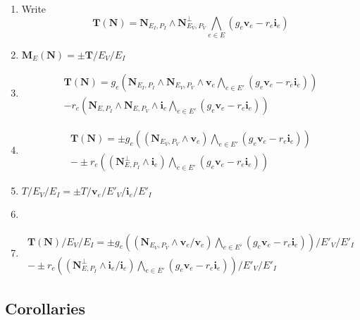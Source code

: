 \documentclass[12pt]{article}
\theoremstyle{definition}
\newcommand{\ext}[1]{\ensuremath{\mathbf{#1}}}
\begin{document}
\begin{enumerate}
\item Write 
\[
\ext{T}(\ext{N})=\ext{N}_{E_I,P_I}
                 \wedge
		 \ext{N}^{\perp}_{E_V,P_V}
		 \bigwedge_{e\in E}(g_e\ext{v}_e-r_e\ext{i}_e)
\]
\item $\ext{M}_E(\ext{N}) = \pm \ext{T}/E_V/E_I$
\item 
\begin{multline}
\ext{T}(\ext{N})=g_e
                 \left(
                    \ext{N}_{E_I,P_I}
                    \wedge
                    \ext{N}_{E_V,P_V}
		    \wedge \ext{v}_e                  
		    \bigwedge_{e\in E'}(g_e\ext{v}_e-r_e\ext{i}_e)
                 \right)  \\
		 - r_e
		 \left(
                    \ext{N}_{E,P_I}
                    \wedge
		    \ext{N}_{E,P_V}
                    \wedge \ext{i}_e
		    \bigwedge_{e\in E'}(g_e\ext{v}_e-r_e\ext{i}_e)
		 \right)
\end{multline}
\item
\begin{multline}
\ext{T}(\ext{N})=\pm g_e
                 \left(
                    (\ext{N}_{E_V,P_V}
                       \wedge \ext{v}_e)
                    \bigwedge_{e\in E'}(g_e\ext{v}_e-r_e\ext{i}_e)
                 \right) \\
		 - \pm r_e
		 \left(
                    (\ext{N}^{\perp}_{E,P_I}
                     \wedge \ext{i}_e)
		    \bigwedge_{e\in E'}(g_e\ext{v}_e-r_e\ext{i}_e)
		 \right)
\end{multline}
\item
$T/E_V/E_I=\pm T/\ext{v}_e/E'_V/\ext{i}_e/E'_I$
\item
\item
\begin{multline}
\ext{T}(\ext{N})/E_V/E_I=\pm g_e
                 \left(
                    (\ext{N}_{E_V,P_V}
                       \wedge \ext{v}_e/\ext{v}_e)
                    \bigwedge_{e\in E'}(g_e\ext{v}_e-r_e\ext{i}_e)
                 \right)/E'_V/E'_I \\
		 - \pm r_e
		 \left(
                    (\ext{N}^{\perp}_{E,P_I}
                     \wedge \ext{i}_e/\ext{i}_e)
		    \bigwedge_{e\in E'}(g_e\ext{v}_e-r_e\ext{i}_e)
		 \right)/E'_V/E'_I 
\end{multline}
\end{enumerate}


\subsection{Corollaries}
\end{document}
